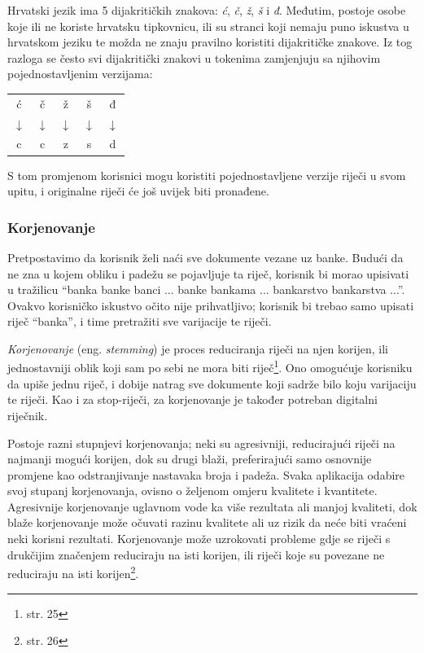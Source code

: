 \documentclass[a4paper,twoside,12pt]{scrreprt}
\newenvironment{nscenter}
 {\par\nopagebreak\centering}
 {\parskip=0pt\par\noindent\ignorespacesafterend}
\begin{document}
Hrvatski jezik ima 5 dijakritičkih znakova: \textit{ć}, \textit{č}, \textit{ž}, \textit{š} i \textit{đ}. Međutim, postoje osobe koje ili ne koriste hrvatsku tipkovnicu, ili su stranci koji nemaju puno iskustva u hrvatskom jeziku te možda ne znaju pravilno koristiti dijakritičke znakove. Iz tog razloga se često svi dijakritički znakovi u tokenima zamjenjuju sa njihovim pojednostavljenim verzijama:

\begin{nscenter}
  \begin{tabular}{ccccc}
    ć            & č            & ž            & š            & đ            \\
    $\downarrow$ & $\downarrow$ & $\downarrow$ & $\downarrow$ & $\downarrow$ \\
    c            & c            & z            & s            & d            \\
  \end{tabular}
\end{nscenter}

S tom promjenom korisnici mogu koristiti pojednostavljene verzije riječi u svom upitu, i originalne riječi će još uvijek biti pronađene.

\subsubsection{Korjenovanje}

Pretpostavimo da korisnik želi naći sve dokumente vezane uz banke. Budući da ne zna u kojem obliku i padežu se pojavljuje ta riječ, korisnik bi morao upisivati u tražilicu ``banka banke banci ... banke bankama ... bankarstvo bankarstva ...''. Ovakvo korisničko iskustvo očito nije prihvatljivo; korisnik bi trebao samo upisati riječ ``banka'', i time pretražiti sve varijacije te riječi.

\textit{Korjenovanje} (eng. \textit{stemming}) je proces reduciranja riječi na njen korijen, ili jednostavniji oblik koji sam po sebi ne mora biti riječ\footnote{\cite{taming} str. 25}. Ono omogućuje korisniku da upiše jednu riječ, i dobije natrag sve dokumente koji sadrže bilo koju varijaciju te riječi. Kao i za stop-riječi, za korjenovanje je također potreban digitalni riječnik.

Postoje razni stupnjevi korjenovanja; neki su agresivniji, reducirajući riječi na najmanji mogući korijen, dok su drugi blaži, preferirajući samo osnovnije promjene kao odstranjivanje nastavaka broja i padeža. Svaka aplikacija odabire svoj stupanj korjenovanja, ovisno o željenom omjeru kvalitete i kvantitete. Agresivnije korjenovanje uglavnom vode ka više rezultata ali manjoj kvaliteti, dok blaže korjenovanje može očuvati razinu kvalitete ali uz rizik da neće biti vraćeni neki korisni rezultati. Korjenovanje može uzrokovati probleme gdje se riječi s drukčijim značenjem reduciraju na isti korijen, ili riječi koje su povezane ne reduciraju na isti korijen\footnote{\cite{taming} str. 26}.
\end{document}
